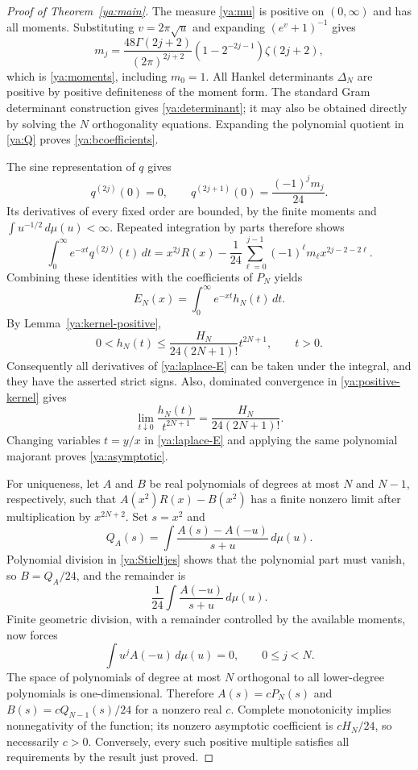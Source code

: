 \documentclass[11pt,a4paper]{article}
\theoremstyle{definition}
\theoremstyle{remark}
\numberwithin{equation}{section}
\begin{document}
\begin{proof}[Proof of Theorem~\ref{ya:main}]
The measure \eqref{ya:mu} is positive on $(0,\infty)$ and has all
moments. Substituting $v=2\pi\sqrt u$ and expanding
$(e^v+1)^{-1}$ gives
\[
 m_j=\frac{48\Gamma(2j+2)}{(2\pi)^{2j+2}}
          (1-2^{-2j-1})\zeta(2j+2),
\]
which is \eqref{ya:moments}, including $m_0=1$.
All Hankel determinants $\Delta_N$ are positive by positive
definiteness of the moment form. The standard Gram determinant
construction gives \eqref{ya:determinant}; it may also be obtained
directly by solving the $N$ orthogonality equations.
Expanding the polynomial quotient in \eqref{ya:Q} proves
\eqref{ya:bcoefficients}.

The sine representation of $q$ gives
\[
 q^{(2j)}(0)=0,\qquad
 q^{(2j+1)}(0)=\frac{(-1)^jm_j}{24}.
\]
Its derivatives of every fixed order are bounded, by the finite
moments and $\int u^{-1/2}\,d\mu(u)<\infty$.
Repeated integration by parts therefore shows
\[
 \int_0^\infty e^{-xt}q^{(2j)}(t)\,dt
 =x^{2j}R(x)-\frac1{24}\sum_{\ell=0}^{j-1}
                (-1)^\ell m_\ell x^{2j-2-2\ell}.
\]
Combining these identities with the coefficients of $P_N$ yields
\begin{equation}\label{ya:laplace-E}
 E_N(x)=\int_0^\infty e^{-xt}h_N(t)\,dt.
\end{equation}
By Lemma~\ref{ya:kernel-positive},
\[
 0<h_N(t)\le\frac{H_N}{24(2N+1)!}t^{2N+1},\qquad t>0.
\]
Consequently all derivatives of \eqref{ya:laplace-E} can be taken
under the integral, and they have the asserted strict signs.
Also, dominated convergence in \eqref{ya:positive-kernel} gives
\[
 \lim_{t\downarrow0}\frac{h_N(t)}{t^{2N+1}}
        =\frac{H_N}{24(2N+1)!}.
\]
Changing variables $t=y/x$ in \eqref{ya:laplace-E} and applying the
same polynomial majorant proves \eqref{ya:asymptotic}.

For uniqueness, let $A$ and $B$ be real polynomials of degrees at
most $N$ and $N-1$, respectively, such that
$A(x^2)R(x)-B(x^2)$ has a finite nonzero limit after multiplication
by $x^{2N+2}$. Set $s=x^2$ and
\[
 Q_A(s)=\int\frac{A(s)-A(-u)}{s+u}\,d\mu(u).
\]
Polynomial division in \eqref{ya:Stieltjes} shows that the
polynomial part must vanish, so $B=Q_A/24$, and the remainder is
\[
 \frac1{24}\int\frac{A(-u)}{s+u}\,d\mu(u).
\]
Finite geometric division, with a remainder controlled by the
available moments, now forces
\[
 \int u^jA(-u)\,d\mu(u)=0,\qquad 0\le j<N.
\]
The space of polynomials of degree at most $N$ orthogonal to all
lower-degree polynomials is one-dimensional. Therefore
$A(s)=cP_N(s)$ and $B(s)=cQ_{N-1}(s)/24$ for a nonzero real $c$.
Complete monotonicity implies nonnegativity of the function; its
nonzero asymptotic coefficient is $cH_N/24$, so necessarily $c>0$.
Conversely, every such positive multiple satisfies all requirements
by the result just proved.
\end{proof}
\end{document}
